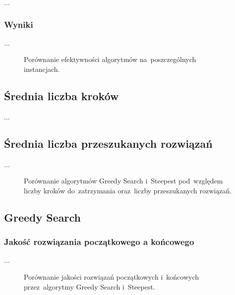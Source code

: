 ...

\subsubsection{Wyniki}

...

\begin{figure}
\begin{center}
\end{center}
\caption{Porównanie efektywności algorytmów na~poszczególnych instancjach.}
\label{fig:eff}
\end{figure}

\subsection{Średnia liczba kroków}

...

\subsection{Średnia liczba przeszukanych rozwiązań}

...

\begin{figure}
\begin{center}
\end{center}
\caption{Porównanie algorytmów Greedy Search i~Steepest pod~względem liczby kroków do~zatrzymania oraz~liczby przeszukanych rozwiązań.}
\label{fig:nsol}
\end{figure}

\subsection{Greedy Search}

\subsubsection{Jakość rozwiązania początkowego a końcowego}

...

\begin{figure}
\begin{center}
\end{center}
\caption{Porównanie jakości rozwiązań początkowych i~końcowych przez~algorytmy Greedy Search i~Steepest.}
\label{fig:diff}
\end{figure}

